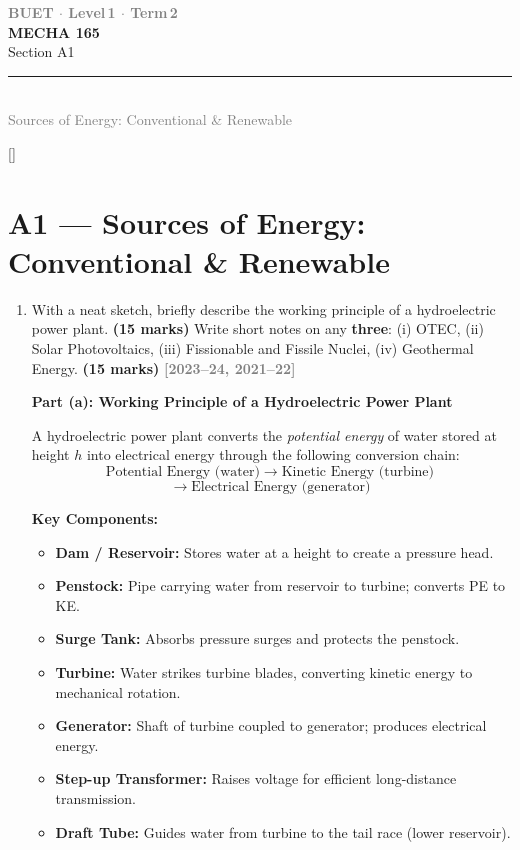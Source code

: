 \documentclass[12pt,a3paper]{article}
\newcommand{\yr}[1]{\hfill\textcolor{gray}{\small\textbf{[#1]}}}
\newcommand{\mk}[1]{\textcolor{orange!70!black}{\small\textbf{(#1 marks)}}}
\newcommand{\secdivider}[4]{%
  \newpage\thispagestyle{empty}%
  \vspace*{\fill}%
  \begin{tcolorbox}[enhanced,colback=#4!7,colframe=#3,boxrule=1.5pt,arc=8pt,
    left=20pt,right=20pt,top=22pt,bottom=22pt,
    shadow={3pt}{-3pt}{0pt}{black!15}]
    \centering
    {\large\textcolor{gray}{\textbf{BUET $\cdot$ Level\,1 $\cdot$ Term\,2}}}\\[8pt]
    {\fontsize{26}{32}\selectfont\bfseries\textcolor{#3}{MECHA 165}}\\[6pt]
    {\fontsize{15}{19}\selectfont\textcolor{dgray}{#1}}\\[12pt]
    \textcolor{#3!60}{\rule{0.5\textwidth}{0.5pt}}\\[6pt]
    {\small\textcolor{gray}{#2}}
  \end{tcolorbox}%
  \vspace*{\fill}\newpage%
}
\begin{document}
\newpage

\secdivider{Section A1}{Sources of Energy: Conventional \& Renewable}{cA}{cA}
\label{sec:A1}
\titleformat{\section}{\large\bfseries\color{cA}}{}{0em}{}[\titlerule]
\section{A1 --- Sources of Energy: Conventional \& Renewable}

\begin{enumerate}
\item \label{qlabel:A1-Q1}
With a neat sketch, briefly describe the working principle of a hydroelectric power plant. \mk{15}
Write short notes on any \textbf{three}: (i) OTEC, (ii) Solar Photovoltaics, (iii) Fissionable and Fissile Nuclei, (iv) Geothermal Energy. \mk{15}
\yr{2023--24, 2021--22}

\begin{tcolorbox}[enhanced,breakable,ansbox,colback=cA!4,colframe=cA,
  boxrule=0.8pt,arc=5pt,
  title={\textbf{Answer}},fonttitle=\bfseries\color{white},colbacktitle=cA]

\textbf{Part (a): Working Principle of a Hydroelectric Power Plant}

A hydroelectric power plant converts the \emph{potential energy} of water stored at height $h$ into electrical energy through the following conversion chain:
\[
  \text{Potential Energy (water)} \;\longrightarrow\; \text{Kinetic Energy (turbine)} \;\]
  \[\longrightarrow\; \text{Electrical Energy (generator)}\]

\textbf{Key Components:}
\begin{itemize}[leftmargin=1.5em,itemsep=2pt]
  \item \textbf{Dam / Reservoir:} Stores water at a height to create a pressure head.
  \item \textbf{Penstock:} Pipe carrying water from reservoir to turbine; converts PE to KE.
  \item \textbf{Surge Tank:} Absorbs pressure surges and protects the penstock.
  \item \textbf{Turbine:} Water strikes turbine blades, converting kinetic energy to mechanical rotation.
  \item \textbf{Generator:} Shaft of turbine coupled to generator; produces electrical energy.
  \item \textbf{Step-up Transformer:} Raises voltage for efficient long-distance transmission.
  \item \textbf{Draft Tube:} Guides water from turbine to the tail race (lower reservoir).
\end{itemize}


\end{tcolorbox}
\end{enumerate}
\end{document}
